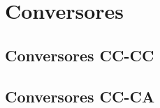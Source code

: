 \section{Conversores}



\subsection{Conversores CC-CC}

% 
% 
% 
% 
% 
% 
\subsection{Conversores CC-CA}
% 
% 
% 
% 


